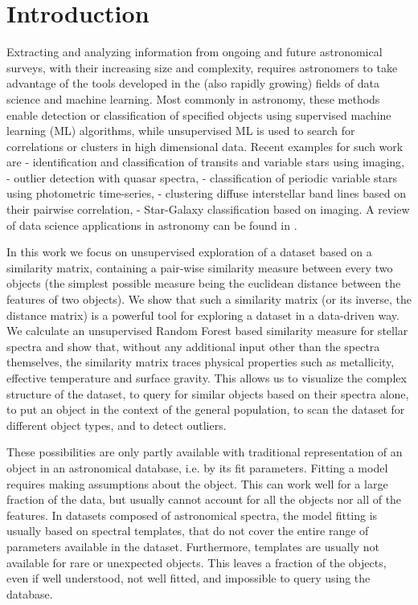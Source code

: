 \documentclass[fleqn,usenatbib]{mnras}
\begin{document}
\section{Introduction}

Extracting and analyzing information from ongoing and future astronomical surveys, with their increasing size and complexity, requires astronomers to take advantage of the tools developed in the (also rapidly growing) fields of data science and machine learning. Most commonly in astronomy, these methods enable detection or classification of specified objects using supervised machine learning (ML) algorithms, while unsupervised ML is used to search for correlations or clusters in high dimensional data. Recent examples for such work are 
\citet{bloom12} - identification and classification of transits and variable stars using imaging, \citet{meusinger12} - outlier detection with quasar spectra, \citet{masci14} - classification of periodic variable stars using photometric time-series, \citet{baron15} - clustering diffuse interstellar band lines based on their pairwise correlation,  \citet{miller17} - Star-Galaxy classification based on imaging.
 A review of data science applications in astronomy can be found in \citet{ball10}. 


In this work we focus on unsupervised exploration of a dataset based on a similarity matrix, containing a pair-wise similarity measure between every two objects (the simplest possible measure being the euclidean distance between the features of two objects). We show that such a similarity matrix (or its inverse, the distance matrix) is a powerful tool for exploring a dataset in a data-driven way. We calculate an unsupervised Random Forest based similarity measure for stellar spectra and show that, without any additional input other than the spectra themselves, the similarity matrix traces physical properties such as metallicity, effective temperature and surface gravity. This allows us to visualize the complex structure of the dataset, to query for similar objects based on their spectra alone, to put an object in the context of the general population, to scan the dataset for different object types, and to detect outliers.

These possibilities are only partly available with traditional representation of an object in an astronomical database, i.e. by its fit parameters. Fitting a model requires making assumptions about the object. This can work well for a large fraction of the data, but usually cannot account for all the objects nor all of the features. In datasets composed of astronomical spectra, the model fitting is usually based on spectral templates, that do not cover the entire range of parameters available in the dataset. Furthermore, templates are usually not available for rare or unexpected objects.  This leaves a fraction of the objects, even if well understood, not well fitted, and impossible to query using the database.
\end{document}
